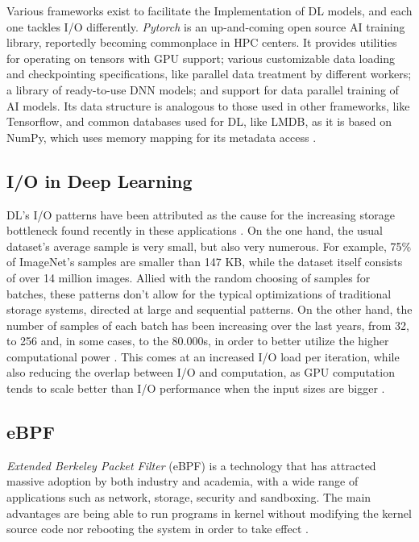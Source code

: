 \documentclass[conference]{IEEEtran}
\begin{document}
    Various frameworks exist to facilitate the Implementation of DL models, and each one tackles I/O differently. \textit{Pytorch} \cite{pytorch} is an up-and-coming open source AI training library, reportedly becoming commonplace in HPC centers. It provides utilities for operating on tensors with GPU support; various customizable data loading and checkpointing specifications, like parallel data treatment by different workers; a library of ready-to-use DNN models; and support for data parallel training of AI models. Its data structure is analogous to those used in other frameworks, like Tensorflow, and common databases used for DL, like LMDB, as it is based on NumPy, which uses memory mapping for its metadata access \cite{LMDB}.

    \subsection{I/O in Deep Learning}

    DL's I/O patterns have been attributed as the cause for the increasing storage bottleneck found recently in these applications \cite{beegfs}. On the one hand, the usual dataset's average sample is very small, but also very numerous. For example, 75\% of ImageNet's samples are smaller than 147 KB, while the dataset itself consists of over 14 million images. Allied with the random choosing of samples for batches, these patterns don't allow for the typical optimizations of traditional storage systems, directed at large and sequential patterns. On the other hand, the number of samples of each batch has been increasing over the last years, from 32, to 256 and, in some cases, to the 80.000s, in order to better utilize the higher computational power \cite{nvme}. This comes at an increased I/O load per iteration, while also reducing the overlap between I/O and computation, as GPU computation tends to scale better than I/O performance when the input sizes are bigger \cite{TFbenchmark}.

    \subsection{eBPF}

    \textit{Extended Berkeley Packet Filter} (eBPF) is a technology that has attracted massive adoption by both industry and academia, with a wide range of applications such as network, storage, security and sandboxing. 
    The main advantages are being able to run programs in kernel without modifying the kernel source code nor rebooting the system in order to take effect \cite{eBPFSurvey}.
\end{document}
